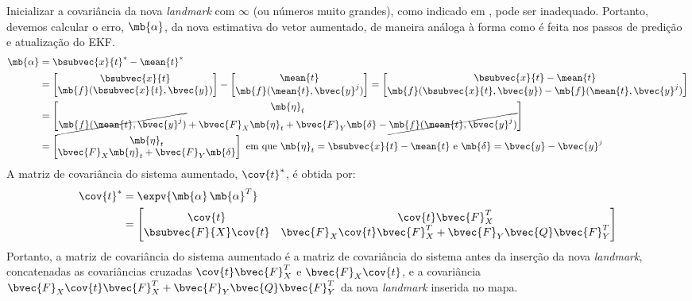 Inicializar a covariância da nova \textit{landmark} com $\infty$ (ou 
números muito grandes), como indicado em 
\cite[p.~317]{bongard2006probabilistic}, pode ser inadequado. Portanto, devemos 
calcular o erro, $\mb{\alpha}$, da nova estimativa do vetor aumentado, de 
maneira análoga à forma como é feita nos passos de predição e atualização 
do EKF. 
\begin{equation}
\begin{aligned}
   \mb{\alpha} &= \bsubvec{x}{t}^* - \mean{t}^*\\
   &= \begin{bmatrix}
       \bsubvec{x}{t} \\ \mb{f}(\bsubvec{x}{t}, \bvec{y})
   \end{bmatrix} - \begin{bmatrix}
       \mean{t} \\ \mb{f}(\mean{t}, \bvec{y}^j)
   \end{bmatrix} = \begin{bmatrix}
       \bsubvec{x}{t} - \mean{t}\\
       \mb{f}(\bsubvec{x}{t}, \bvec{y}) - \mb{f}(\mean{t}, \bvec{y}^j)
   \end{bmatrix}\\
   &= \begin{bmatrix}
       \mb{\eta}_t \\
       \cancel{\mb{f}(\mean{t}, \bvec{y}^j)} + 
       \bvec{F}_X \mb{\eta}_t + \bvec{F}_Y \mb{\delta}
       - \cancel{\mb{f}(\mean{t}, \bvec{y}^j)}
   \end{bmatrix} \\
    &= \begin{bmatrix}
       \mb{\eta}_t \\
       \bvec{F}_X \mb{\eta}_t + \bvec{F}_Y \mb{\delta} 
   \end{bmatrix} \text{ em que $\mb{\eta}_t = \bsubvec{x}{t} - \mean{t}$ e $\mb{\delta} = \bvec{y} - \bvec{y}^j$}
\end{aligned}
\end{equation}
A matriz de covariância do sistema aumentado, $\cov{t}^*$, é obtida por:
\renewcommand{\arraystretch}{1.5}
\newcommand{\eqCovarianceAugmented}{\begin{bmatrix}
       \cov{t} & \cov{t} \bvec{F}_X^T\\
       \bsubvec{F}{X} \cov{t} &  \bvec{F}_X \cov{t} \bvec{F}_X^T 
       + \bvec{F}_Y \bvec{Q} \bvec{F}_Y^T
    \end{bmatrix}}
\begin{equation}
\begin{aligned}
  \cov{t}^* &= \expv{\mb{\alpha} \,\mb{\alpha}^T} \\
  &= \eqCovarianceAugmented
\end{aligned}
\label{eq:ekf-landmark-insertion-covariance}
\end{equation}
\renewcommand{\arraystretch}{1}
Portanto, a matriz de covariância do sistema aumentado é a matriz de 
covariância do sistema antes da inserção da nova \textit{landmark}, 
concatenadas as covariâncias cruzadas $\cov{t} \bvec{F}_X^T$ e $\bvec{F}_X \cov{t}$, e a covariância $\bvec{F}_X \cov{t} \bvec{F}_X^T + \bvec{F}_Y 
\bvec{Q} \bvec{F}_Y^T$ da nova \textit{landmark} inserida no mapa. 

